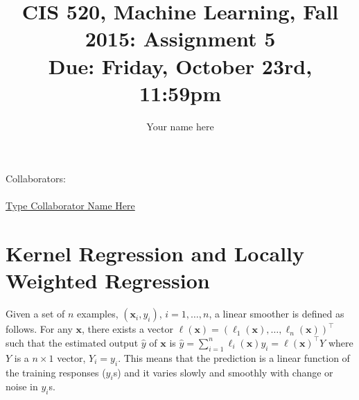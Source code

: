\documentclass[english]{article}
\title{CIS 520, Machine Learning, Fall 2015: Assignment 5 \\
Due: Friday, October 23rd, 11:59pm}
\date{}
\author{Your name here}
\newcommand{\bx}{\mathbf{x}}
\begin{document}
\maketitle
{\normalsize Collaborators: \\ 
\\ \underline{ Type Collaborator Name Here        }} \\

\section{Kernel Regression and Locally Weighted Regression}
\label{sec:regression}

Given a set of $n$ examples, $(\bx_i,y_i)$, $i=1,\ldots,n$, a linear
smoother is defined as follows. For any $\bx$, there exists a vector
$\ell(\bx)=(\ell_1(\bx),\ldots,\ell_n(\bx))^\top$ such that the
estimated output $\hat{y}$ of $\bx$ is
$\hat{y}=\sum_{i=1}^{n}\ell_i(\bx)y_i=\ell(\bx)^\top Y$ where $Y$ is a
$n\times 1$ vector, $Y_i=y_i$.  This means that the prediction is a
linear function of the training responses ($y_i$s) and it varies
slowly and smoothly with change or noise in $y_i$s.

\bigskip
\end{document}
